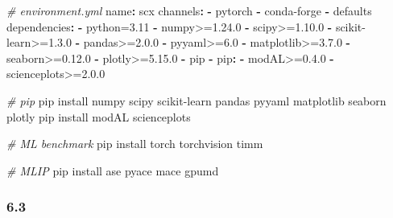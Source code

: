 \documentclass[
  12pt,
]{article}
\newenvironment{Shaded}{}{}
\newcommand{\AttributeTok}[1]{\textcolor[rgb]{0.49,0.56,0.16}{#1}}
\newcommand{\CommentTok}[1]{\textcolor[rgb]{0.38,0.63,0.69}{\textit{#1}}}
\newcommand{\ExtensionTok}[1]{#1}
\newcommand{\FunctionTok}[1]{\textcolor[rgb]{0.02,0.16,0.49}{#1}}
\newcommand{\KeywordTok}[1]{\textcolor[rgb]{0.00,0.44,0.13}{\textbf{#1}}}
\newcommand{\NormalTok}[1]{#1}
\begin{document}
\begin{Shaded}
\begin{Highlighting}[]
\CommentTok{\# environment.yml}
\FunctionTok{name}\KeywordTok{:}\AttributeTok{ scx}
\FunctionTok{channels}\KeywordTok{:}
\AttributeTok{  }\KeywordTok{{-}}\AttributeTok{ pytorch}
\AttributeTok{  }\KeywordTok{{-}}\AttributeTok{ conda{-}forge}
\AttributeTok{  }\KeywordTok{{-}}\AttributeTok{ defaults}
\FunctionTok{dependencies}\KeywordTok{:}
\AttributeTok{  }\KeywordTok{{-}}\AttributeTok{ python=3.11}
\AttributeTok{  }\KeywordTok{{-}}\AttributeTok{ numpy\textgreater{}=1.24.0}
\AttributeTok{  }\KeywordTok{{-}}\AttributeTok{ scipy\textgreater{}=1.10.0}
\AttributeTok{  }\KeywordTok{{-}}\AttributeTok{ scikit{-}learn\textgreater{}=1.3.0}
\AttributeTok{  }\KeywordTok{{-}}\AttributeTok{ pandas\textgreater{}=2.0.0}
\AttributeTok{  }\KeywordTok{{-}}\AttributeTok{ pyyaml\textgreater{}=6.0}
\AttributeTok{  }\KeywordTok{{-}}\AttributeTok{ matplotlib\textgreater{}=3.7.0}
\AttributeTok{  }\KeywordTok{{-}}\AttributeTok{ seaborn\textgreater{}=0.12.0}
\AttributeTok{  }\KeywordTok{{-}}\AttributeTok{ plotly\textgreater{}=5.15.0}
\AttributeTok{  }\KeywordTok{{-}}\AttributeTok{ pip}
\AttributeTok{  }\KeywordTok{{-}}\AttributeTok{ }\FunctionTok{pip}\KeywordTok{:}
\AttributeTok{    }\KeywordTok{{-}}\AttributeTok{ modAL\textgreater{}=0.4.0}
\AttributeTok{    }\KeywordTok{{-}}\AttributeTok{ scienceplots\textgreater{}=2.0.0}
\end{Highlighting}
\end{Shaded}

\begin{Shaded}
\begin{Highlighting}[]
\CommentTok{\#  pip}
\ExtensionTok{pip}\NormalTok{ install numpy scipy scikit{-}learn pandas pyyaml matplotlib seaborn plotly}
\ExtensionTok{pip}\NormalTok{ install modAL scienceplots}

\CommentTok{\# ML benchmark }
\ExtensionTok{pip}\NormalTok{ install torch torchvision timm}

\CommentTok{\# MLIP }
\ExtensionTok{pip}\NormalTok{ install ase pyace mace gpumd}
\end{Highlighting}
\end{Shaded}

\subsubsection{6.3
}\label{ux8ba1ux7b97ux8d44ux6e90ux4f30ux8ba1}

\paragraph{}\label{ux5408ux6210ux5b9eux9a8c}
\end{document}
